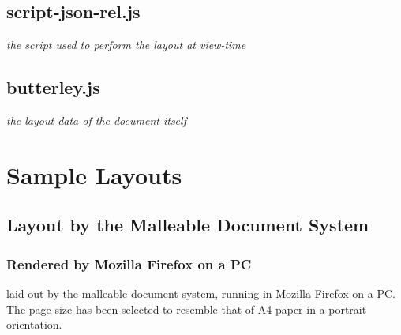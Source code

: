 \section{script-json-rel.js}
\emph{the script used to perform the layout at view-time}

%

\newpage

\section{butterley.js}
\emph{the layout data of the document itself}

%






\cleardoublepage
\chapter{Sample Layouts}
\label{app:layouts}

\section{Layout by the Malleable Document System}

\newlength{\imgwid}

\subsection{Rendered by Mozilla Firefox on a PC}
\label{app:layout-ff}

\cite{Pinkney2011} laid out by the malleable document system, running in Mozilla Firefox on a PC. The page size has been selected to resemble that of A4 paper in a portrait orientation.

